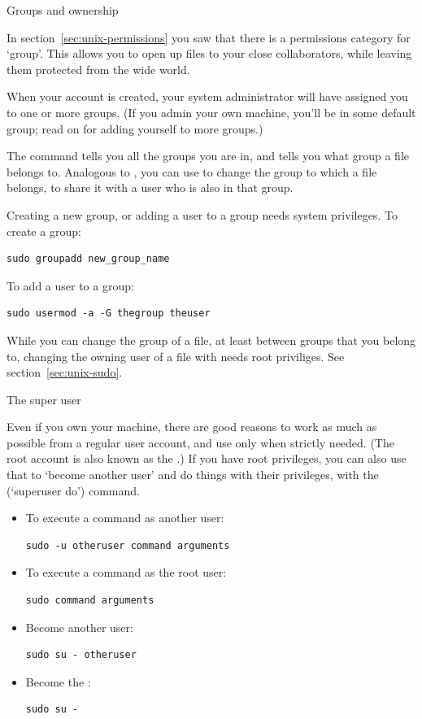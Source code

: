  {Groups and ownership}
\label{sec:tut-group-own}

In section~\ref{sec:unix-permissions} you saw that there is a
permissions category for `group'. This allows you to open up files to
your close collaborators, while leaving them protected from the wide
world.

When your account is created, your system administrator will have
assigned you to one or more groups. (If you admin your own machine,
you'll be in some default group; read on for adding yourself to more groups.)

The command 
tells you all the groups you are in, and  tells you
what group a file belongs to. Analogous to ,
you can use  to change the group to
which a file belongs, to share it with a user who is also in that group.

Creating a new group, or
adding a user to a group needs system privileges.
To create a group:
\begin{lstlisting}
sudo groupadd new_group_name
\end{lstlisting}
To add a user to a group:
\begin{lstlisting}
sudo usermod -a -G thegroup theuser
\end{lstlisting}

While you can change the group of a file,
at least between groups that you belong to,
changing the owning user of a file with 
needs root priviliges. See section~\ref{sec:unix-sudo}.

 {The super user}
\label{sec:unix-sudo}

Even if you own your machine, there are good reasons to work as much
as possible from a regular user account, and use
 only when strictly needed.
%
(The root account is also known as the .)
%
If you have root privileges, you can also use that to `become another
user' and do things with their privileges, with the
 (`superuser do') command.

\begin{itemize}
\item To execute a command as another user:
\begin{lstlisting}
sudo -u otheruser command arguments
\end{lstlisting}
\item To execute a command as the root user:
\begin{lstlisting}
sudo command arguments
\end{lstlisting}
\item Become another user:
\begin{lstlisting}
sudo su - otheruser
\end{lstlisting}
\item Become the :
\begin{lstlisting}
sudo su -
\end{lstlisting}
\end{itemize}

